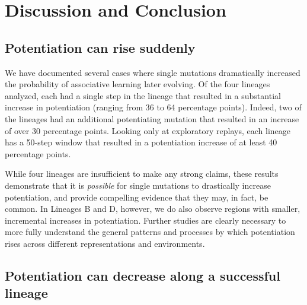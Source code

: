 \section{Discussion and Conclusion}

\subsection{Potentiation can rise suddenly}

We have documented several cases where single mutations dramatically increased the probability of associative learning later evolving. %
Of the four lineages analyzed, each had a single step in the lineage that resulted in a substantial increase in potentiation (ranging from 36 to 64 percentage points). 
Indeed, two of the lineages had an additional potentiating mutation that resulted in an increase of over 30 percentage points.
Looking only at exploratory replays, each lineage has a 50-step window that resulted in a potentiation increase of at least 40 percentage points.

While four lineages are insufficient to make any strong claims, these results demonstrate that it is \textit{possible} for single mutations to drastically increase potentiation, and provide compelling evidence that they may, in fact, be common. 
In Lineages B and D, however, we do also observe regions with smaller, incremental increases in potentiation.
Further studies are clearly necessary to more fully understand the general patterns and processes by which potentiation rises across different representations and environments.


\subsection{Potentiation can decrease along a successful lineage}

